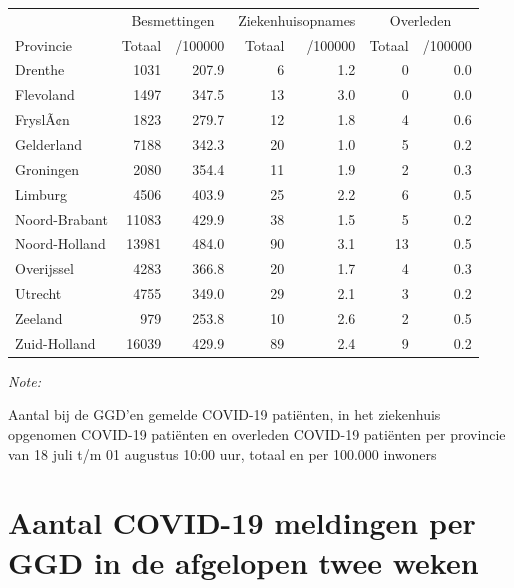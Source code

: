 \documentclass[
  english,
  man,floatsintext]{apa6}
\begin{document}
\begin{table}
\centering
\begin{threeparttable}
\begin{tabular}{lrrrrrr}
\toprule
\multicolumn{1}{c}{ } & \multicolumn{2}{c}{Besmettingen} & \multicolumn{2}{c}{Ziekenhuisopnames} & \multicolumn{2}{c}{Overleden} \\
\cmidrule(l{3pt}r{3pt}){2-3} \cmidrule(l{3pt}r{3pt}){4-5} \cmidrule(l{3pt}r{3pt}){6-7}
Provincie & Totaal & /100000 & Totaal & /100000 & Totaal & /100000\\
\midrule
Drenthe & 1031 & 207.9 & 6 & 1.2 & 0 & 0.0\\
Flevoland & 1497 & 347.5 & 13 & 3.0 & 0 & 0.0\\
FryslÃ¢n & 1823 & 279.7 & 12 & 1.8 & 4 & 0.6\\
Gelderland & 7188 & 342.3 & 20 & 1.0 & 5 & 0.2\\
Groningen & 2080 & 354.4 & 11 & 1.9 & 2 & 0.3\\
Limburg & 4506 & 403.9 & 25 & 2.2 & 6 & 0.5\\
Noord-Brabant & 11083 & 429.9 & 38 & 1.5 & 5 & 0.2\\
Noord-Holland & 13981 & 484.0 & 90 & 3.1 & 13 & 0.5\\
Overijssel & 4283 & 366.8 & 20 & 1.7 & 4 & 0.3\\
Utrecht & 4755 & 349.0 & 29 & 2.1 & 3 & 0.2\\
Zeeland & 979 & 253.8 & 10 & 2.6 & 2 & 0.5\\
Zuid-Holland & 16039 & 429.9 & 89 & 2.4 & 9 & 0.2\\
\bottomrule
\end{tabular}
\begin{tablenotes}
\item \textit{Note: } 
\item Aantal bij de GGD’en gemelde COVID-19 patiënten, in het ziekenhuis opgenomen COVID-19 patiënten en overleden COVID-19 patiënten per provincie van 18 juli t/m 01 augustus 10:00 uur, totaal en per 100.000 inwoners
\end{tablenotes}
\end{threeparttable}
\end{table}

\newpage

\hypertarget{aantal-covid-19-meldingen-per-ggd-in-de-afgelopen-twee-weken}{%
\section{Aantal COVID-19 meldingen per GGD in de afgelopen twee weken}\label{aantal-covid-19-meldingen-per-ggd-in-de-afgelopen-twee-weken}}
\end{document}
